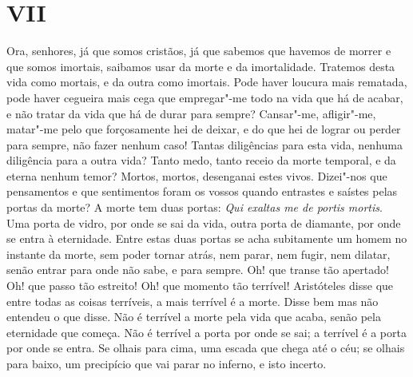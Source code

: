 \section{VII}

Ora, senhores, já que somos cristãos, já que sabemos que havemos de
morrer e que somos imortais, saibamos usar da morte e da imortalidade.
Tratemos desta vida como mortais, e da outra como imortais. Pode haver
loucura mais rematada, pode haver cegueira mais cega que empregar"-me
todo na vida que há de acabar, e não tratar da vida que há de durar para
sempre? Cansar"-me, afligir"-me, matar"-me pelo que forçosamente hei de
deixar, e do que hei de lograr ou perder para sempre, não fazer nenhum
caso! Tantas diligências para esta vida, nenhuma diligência para a outra
vida? Tanto medo, tanto receio da morte temporal, e da eterna nenhum
temor? Mortos, mortos, desenganai estes vivos. Dizei"-nos que pensamentos
e que sentimentos foram os vossos quando entrastes e saístes pelas
portas da morte? A morte tem duas portas: \emph{Qui exaltas me de portis
mortis}. Uma porta de vidro, por onde se sai da vida, outra porta de
diamante, por onde se entra à eternidade. Entre estas duas portas se
acha subitamente um homem no instante da morte, sem poder tornar atrás,
nem parar, nem fugir, nem dilatar, senão entrar para onde não sabe, e
para sempre. Oh! que transe tão apertado! Oh! que passo tão estreito!
Oh! que momento tão terrível! Aristóteles disse que entre todas as
coisas terríveis, a mais terrível é
a morte. Disse bem mas não entendeu o que disse. Não é terrível a morte
pela vida que acaba, senão pela eternidade que começa. Não é terrível a
porta por onde se sai; a terrível é a porta por onde se entra. Se olhais
para cima, uma escada que chega até o céu; se olhais para baixo, um
precipício que vai parar no inferno, e isto incerto.

